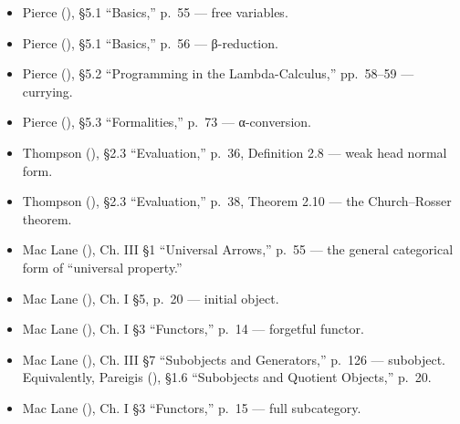 \begin{itemize}
\tightlist
\item
  Pierce (\cite{Pierce2002}), §5.1 ``Basics,'' p.~55 --- free variables.
\item
  Pierce (\cite{Pierce2002}), §5.1 ``Basics,'' p.~56 --- β-reduction.
\item
  Pierce (\cite{Pierce2002}), §5.2 ``Programming in the Lambda-Calculus,'' pp.~58--59 --- currying.
\item
  Pierce (\cite{Pierce2002}), §5.3 ``Formalities,'' p.~73 --- α-conversion.
\item
  Thompson (\cite{Thompson1991}), §2.3 ``Evaluation,'' p.~36, Definition 2.8 --- weak head normal form.
\item
  Thompson (\cite{Thompson1991}), §2.3 ``Evaluation,'' p.~38, Theorem 2.10 --- the Church--Rosser theorem.
\item
  Mac Lane (\cite{MacLane1998}), Ch. III §1 ``Universal Arrows,'' p.~55 --- the general categorical form of ``universal property.''
\item
  Mac Lane (\cite{MacLane1998}), Ch. I §5, p.~20 --- initial object.
\item
  Mac Lane (\cite{MacLane1998}), Ch. I §3 ``Functors,'' p.~14 --- forgetful functor.
\item
  Mac Lane (\cite{MacLane1998}), Ch. III §7 ``Subobjects and Generators,'' p.~126 --- subobject. Equivalently, Pareigis (\cite{Pareigis1970}), §1.6 ``Subobjects and Quotient Objects,'' p.~20.
\item
  Mac Lane (\cite{MacLane1998}), Ch. I §3 ``Functors,'' p.~15 --- full subcategory.
\end{itemize}
